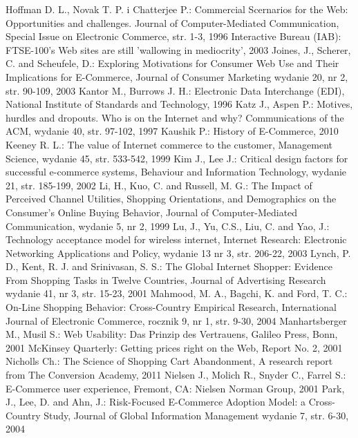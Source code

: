 {\begin{thebibliography}{40}
     Hoffman D. L., Novak T. P. i Chatterjee P.: Commercial Scernarios for the Web: Opportunities and challenges. Journal of Computer-Mediated Communication, Special Issue on Electronic Commerce, str. 1-3, 1996
     Interactive Bureau (IAB): FTSE-100's Web sites are still 'wallowing in mediocrity', 2003
     Joines, J., Scherer, C. and Scheufele, D.: Exploring Motivations for Consumer Web Use and Their Implications for E-Commerce, Journal of Consumer Marketing wydanie 20, nr 2, str. 90-109, 2003
     Kantor M., Burrows J. H.: Electronic Data Interchange (EDI), National Institute of Standards and Technology, 1996
     Katz J., Aspen P.: Motives, hurdles and dropouts. Who is on the Internet and why? Communications of the ACM, wydanie 40, str. 97-102, 1997
     Kaushik P.: History of E-Commerce, 2010
     Keeney R. L.: The value of Internet commerce to the customer, Management Science, wydanie 45, str. 533-542, 1999
     Kim J., Lee J.: Critical design factors for successful e-commerce systems, Behaviour and Information Technology, wydanie 21, str. 185-199, 2002
     Li, H., Kuo, C. and Russell, M. G.: The Impact of Perceived Channel Utilities, Shopping Orientations, and Demographics on the Consumer's Online Buying Behavior, Journal of Computer-Mediated Communication, wydanie 5, nr 2, 1999
     Lu, J., Yu, C.S., Liu, C. and Yao, J.: Technology acceptance model for wireless internet, Internet Research: Electronic Networking Applications and Policy, wydanie 13 nr 3, str. 206-22, 2003
     Lynch, P. D., Kent, R. J. and Srinivasan, S. S.: The Global Internet Shopper: Evidence From Shopping Tasks in Twelve Countries, Journal of Advertising Research wydanie 41, nr 3, str. 15-23, 2001
     Mahmood, M. A., Bagchi, K. and Ford, T. C.: On-Line Shopping Behavior: Cross-Country Empirical Research, International Journal of Electronic Commerce, rocznik 9, nr 1, str. 9-30, 2004
     Manhartsberger M., Musil S.: Web Usability: Das Prinzip des Vertrauens, Galileo Press, Bonn, 2001
     McKinsey Quarterly: Getting prices right on the Web, Report No. 2, 2001
     Nicholls Ch.: The Science of Shopping Cart Abandonment, A research report from The Conversion Academy, 2011
     Nielsen J., Molich R., Snyder C., Farrel S.: E-Commerce user experience, Fremont, CA: Nielsen Norman Group, 2001
     Park, J., Lee, D. and Ahn, J.: Risk-Focused E-Commerce Adoption Model: a Cross-Country Study, Journal of Global Information Management wydanie 7, str. 6-30, 2004

\end{thebibliography}}
